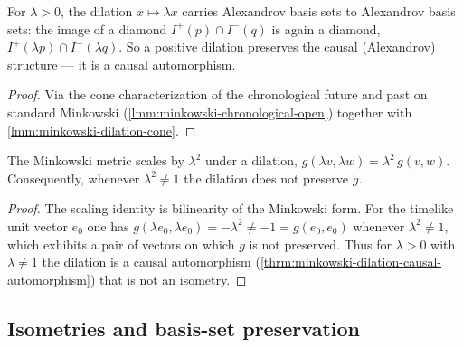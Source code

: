 \begin{theorem}
    \label{thrm:minkowski-dilation-causal-automorphism}
    \leanok
    For $\lambda > 0$, the dilation $x \mapsto \lambda x$ carries Alexandrov basis sets to Alexandrov basis sets: the image of a diamond $I^+(p) \cap I^-(q)$ is again a diamond, $I^+(\lambda p) \cap I^-(\lambda q)$. So a positive dilation preserves the causal (Alexandrov) structure --- it is a causal automorphism.
\end{theorem}
\begin{proof}
    \leanok
    Via the cone characterization of the chronological future and past on standard Minkowski (\ref{lmm:minkowski-chronological-open}) together with \ref{lmm:minkowski-dilation-cone}.
\end{proof}

\begin{theorem}
    \label{thrm:minkowski-dilation-not-isometry}
    \leanok
    The Minkowski metric scales by $\lambda^2$ under a dilation, $g(\lambda v, \lambda w) = \lambda^2\, g(v,w)$. Consequently, whenever $\lambda^2 \neq 1$ the dilation does not preserve $g$.
\end{theorem}
\begin{proof}
    \leanok
    The scaling identity is bilinearity of the Minkowski form. For the timelike unit vector $e_0$ one has $g(\lambda e_0, \lambda e_0) = -\lambda^2 \neq -1 = g(e_0, e_0)$ whenever $\lambda^2 \neq 1$, which exhibits a pair of vectors on which $g$ is not preserved. Thus for $\lambda > 0$ with $\lambda \neq 1$ the dilation is a causal automorphism (\ref{thrm:minkowski-dilation-causal-automorphism}) that is not an isometry.
\end{proof}

\subsection{Isometries and basis-set preservation}


